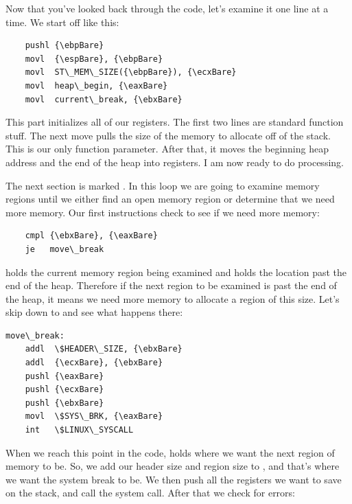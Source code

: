 Now that you've looked back through the code, let's examine it one line at a time.  We start
off like this:

\begin{simpletyping}
\begin{lstlisting}
	pushl {\ebpBare}
	movl  {\espBare}, {\ebpBare}
	movl  ST\_MEM\_SIZE({\ebpBare}), {\ecxBare}
	movl  heap\_begin, {\eaxBare}
	movl  current\_break, {\ebxBare}
\end{lstlisting}
\end{simpletyping}

This part initializes all of our registers.  The first two lines are standard function
stuff.  The next move pulls the size of the memory to allocate off of the stack.  This is
our only function parameter.   After that, it moves the beginning heap address and the 
end of the heap into registers.  I am now ready to do processing.

The next section is marked .  In this loop
we are going to examine memory regions until we either find an open memory region or 
determine that we need more memory.  Our first instructions check to see if we need more memory:

\begin{simpletyping}
\begin{lstlisting}
	cmpl {\ebxBare}, {\eaxBare}
	je   move\_break
\end{lstlisting}
\end{simpletyping}

{\eaxReg} holds the current memory region being examined and {\ebxReg}
holds the location past the end of the heap.  Therefore if the next region to be
examined is past the end of the heap, it means we need more 
memory to allocate a region of this size.  
Let's skip down to  and
see what happens there:

\begin{simpletyping}
\begin{lstlisting}
move\_break:
	addl  \$HEADER\_SIZE, {\ebxBare}
	addl  {\ecxBare}, {\ebxBare}
	pushl {\eaxBare}
	pushl {\ecxBare}
	pushl {\ebxBare}
	movl  \$SYS\_BRK, {\eaxBare}
	int   \$LINUX\_SYSCALL
\end{lstlisting}
\end{simpletyping}

When we reach this point in the code, {\ebxReg} holds where we want the next
region of memory to be.    
So, we add our header size and region size to {\ebxReg}, and that's where we want the system break 
to be.  We then push all the registers we want to save on the stack, and call the 
 system call. After that we check for errors:

